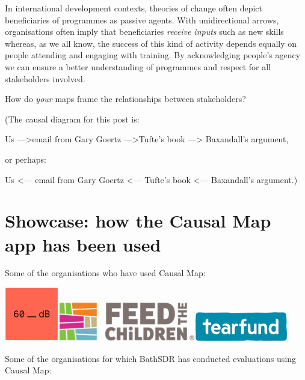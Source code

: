 \documentclass[
]{book}
\begin{document}
In international development contexts, theories of change often depict beneficiaries of programmes as passive agents. With unidirectional arrows, organisations often imply that beneficiaries \emph{receive inputs} such as new skills whereas, as we all know, the success of this kind of activity depends equally on people attending and engaging with training. By acknowledging people's agency we can ensure a better understanding of programmes and respect for all stakeholders involved.

How do \emph{your} maps frame the relationships between stakeholders?

(The causal diagram for this post is:

Us ---\textgreater email from Gary Goertz ---\textgreater Tufte's book ---\textgreater{} Baxandall's argument,

or perhaps:

Us \textless--- email from Gary Goertz \textless--- Tufte's book \textless--- Baxandall's argument.)

\hypertarget{showcase}{%
\chapter{Showcase: how the Causal Map app has been used}\label{showcase}}

Some of the organisations who have used Causal Map:

\href{https://60decibels.com/}{\includegraphics{_assets/logo1.png}}\href{https://causalmap.app/logo3/}{}\href{http://www.feedthechildren.org/}{\includegraphics{_assets/logo2.png}}\href{https://www.tearfund.org/}{\includegraphics{_assets/logo3.png}}

Some of the organisations for which BathSDR has conducted evaluations using Causal Map:
\end{document}
